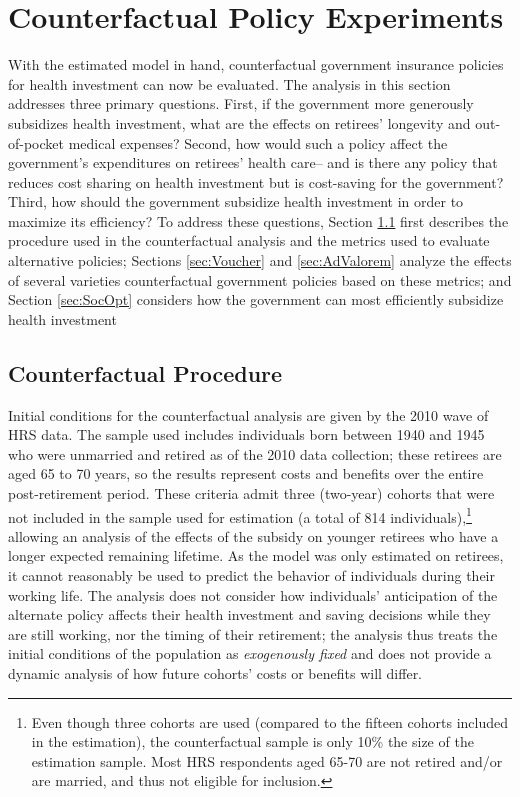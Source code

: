\documentclass[12pt,pdftex,letterpaper]{article}
\begin{document}
\section{Counterfactual Policy Experiments}
\label{sec:Counterfactual}

With the estimated model in hand, counterfactual government insurance policies for health investment can now be evaluated.  The analysis in this section addresses three primary questions.  First, if the government more generously subsidizes health investment, what are the effects on retirees' longevity and out-of-pocket medical expenses?  Second, how would such a policy affect the government's expenditures on retirees' health care-- and is there any policy that reduces cost sharing on health investment but is cost-saving for the government?  Third, how should the government subsidize health investment in order to maximize its efficiency?  To address these questions, Section \ref{sec:CounterfactualProcedure} first describes the procedure used in the counterfactual analysis and the metrics used to evaluate alternative policies; Sections \ref{sec:Voucher} and \ref{sec:AdValorem} analyze the effects of several varieties counterfactual government policies based on these metrics; and Section \ref{sec:SocOpt} considers how the government can most efficiently subsidize health investment

\subsection{Counterfactual Procedure}
\label{sec:CounterfactualProcedure}

Initial conditions for the counterfactual analysis are given by the 2010 wave of HRS data.  The sample used includes individuals born between 1940 and 1945 who were unmarried and retired as of the 2010 data collection; these retirees are aged 65 to 70 years, so the results represent costs and benefits over the entire post-retirement period.  These criteria admit three (two-year) cohorts that were not included in the sample used for estimation (a total of 814 individuals),\footnote{Even though three cohorts are used (compared to the fifteen cohorts included in the estimation), the counterfactual sample is only 10\% the size of the estimation sample. Most HRS respondents aged 65-70 are not retired and/or are married, and thus not eligible for inclusion.} allowing an analysis of the effects of the subsidy on younger retirees who have a longer expected remaining lifetime. As the model was only estimated on retirees, it cannot reasonably be used to predict the behavior of individuals during their working life.  The analysis does not consider how individuals' anticipation of the alternate policy affects their health investment and saving decisions while they are still working, nor the timing of their retirement; the analysis thus treats the initial conditions of the population as \textit{exogenously fixed} and does not provide a dynamic analysis of how future cohorts' costs or benefits will differ.  
\end{document}
